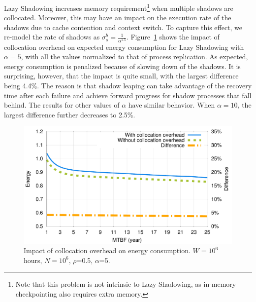 
Lazy Shadowing increases memory requirement\footnote{Note that this problem is not intrinsic to Lazy Shadowing, as in-memory checkpointing also requires extra memory.} when multiple shadows are collocated. Moreover, this may have an impact on the execution rate of the shadows due to cache contention and context switch. 
To capture this effect,  
we re-model the rate of shadows as $\sigma_s^b=\frac{1}{\alpha^{1.5}}$.
Figure~\ref{fig:comp_vary_fail_speed} shows the impact of collocation overhead on expected energy consumption for Lazy Shadowing with $\alpha=5$, with all the values normalized to that of process replication. %
As expected, energy consumption is penalized because
of slowing down of the shadows. It is surprising, however, that the impact is quite small, with the largest difference being 4.4\%. The reason is that shadow leaping can take advantage of the recovery time after each failure and achieve forward progress for shadow processes that fall behind. 
The results for other values of $\alpha$ have similar behavior. 
When $\alpha=10$, the largest difference further decreases to 2.5\%. 


\begin{figure}[t]
	\begin{center}
		\includegraphics[width=0.7\columnwidth]{Figures/collocation.pdf}
	\end{center}
	\caption{Impact of collocation overhead on energy consumption. $W=10^6$ hours, $N=10^6$, $\rho$=0.5, $\alpha$=5.}
	\label{fig:comp_vary_fail_speed}
\end{figure}
